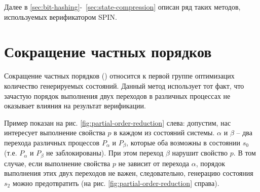 Далее в \ref{sec:bit-hashing}-~\ref{sec:state-compression} описан ряд таких методов,
используемых верификатором SPIN.

\section{Сокращение частных порядков}
\label{sec:partial-order-reduction}

Сокращение частных порядков () \cite{POD} относится к первой
группе оптимизацих количество генерируемых состояний. Данный метод использует тот факт,
что зачастую порядок выполнения двух переходов в различных процессах не оказывает влияния
на результат верификации.

Пример показан на рис. \ref{fig:partial-order-reduction} слева:
допустим, нас интересует выполнение свойства $p$ в каждом из состояний
системы. $\alpha$ и $\beta$ -- два перехода различных процессов
$P_{\alpha}$ и $P_{\beta}$, которые оба возможны в состоянии $s_0$
(т.е. $P_{\alpha}$ и $P_{\beta}$ не заблокированы). При этом переход
$\beta$ нарушит свойство $p$. В том случае, если выполнение свойства
$p$ не зависит от перехода $\alpha$, порядок выполнения этих двух
переходов не важен, следовательно, генерацию состояния $s_2$ можно
предотвратить (на рис. \ref{fig:partial-order-reduction} справа).

    
    
